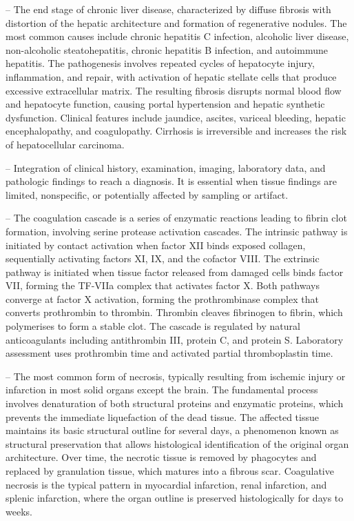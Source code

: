 -- The end stage of chronic liver disease, characterized by diffuse fibrosis with distortion of the hepatic architecture and formation of regenerative nodules. The most common causes include chronic hepatitis C infection, alcoholic liver disease, non-alcoholic steatohepatitis, chronic hepatitis B infection, and autoimmune hepatitis. The pathogenesis involves repeated cycles of hepatocyte injury, inflammation, and repair, with activation of hepatic stellate cells that produce excessive extracellular matrix. The resulting fibrosis disrupts normal blood flow and hepatocyte function, causing portal hypertension and hepatic synthetic dysfunction. Clinical features include jaundice, ascites, variceal bleeding, hepatic encephalopathy, and coagulopathy. Cirrhosis is irreversible and increases the risk of hepatocellular carcinoma.

-- Integration of clinical history, examination, imaging, laboratory data, and pathologic findings to reach a diagnosis. It is essential when tissue findings are limited, nonspecific, or potentially affected by sampling or artifact.

-- The coagulation cascade is a series of enzymatic reactions leading to fibrin clot formation, involving serine protease activation cascades. The intrinsic pathway is initiated by contact activation when factor XII binds exposed collagen, sequentially activating factors XI, IX, and the cofactor VIII. The extrinsic pathway is initiated when tissue factor released from damaged cells binds factor VII, forming the TF-VIIa complex that activates factor X. Both pathways converge at factor X activation, forming the prothrombinase complex that converts prothrombin to thrombin. Thrombin cleaves fibrinogen to fibrin, which polymerises to form a stable clot. The cascade is regulated by natural anticoagulants including antithrombin III, protein C, and protein S. Laboratory assessment uses prothrombin time and activated partial thromboplastin time.

-- The most common form of necrosis, typically resulting from ischemic injury or infarction in most solid organs except the brain. The fundamental process involves denaturation of both structural proteins and enzymatic proteins, which prevents the immediate liquefaction of the dead tissue. The affected tissue maintains its basic structural outline for several days, a phenomenon known as structural preservation that allows histological identification of the original organ architecture. Over time, the necrotic tissue is removed by phagocytes and replaced by granulation tissue, which matures into a fibrous scar. Coagulative necrosis is the typical pattern in myocardial infarction, renal infarction, and splenic infarction, where the organ outline is preserved histologically for days to weeks.

